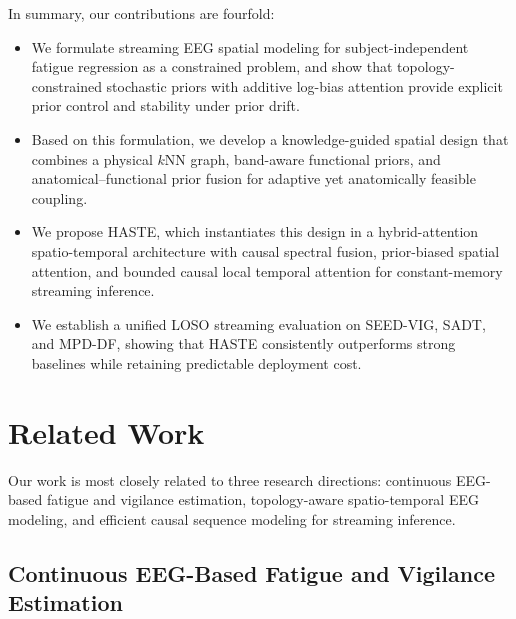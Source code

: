 \documentclass[preprint,12pt]{elsarticle}
\begin{document}
In summary, our contributions are fourfold:
\begin{itemize}
\item We formulate streaming EEG spatial modeling for subject-independent fatigue regression as a constrained problem, and show that topology-constrained stochastic priors with additive log-bias attention provide explicit prior control and stability under prior drift.

\item Based on this formulation, we develop a knowledge-guided spatial design that combines a physical $k$NN graph, band-aware functional priors, and anatomical--functional prior fusion for adaptive yet anatomically feasible coupling.

\item We propose HASTE, which instantiates this design in a hybrid-attention spatio-temporal architecture with causal spectral fusion, prior-biased spatial attention, and bounded causal local temporal attention for constant-memory streaming inference.

\item We establish a unified LOSO streaming evaluation on SEED-VIG, SADT, and MPD-DF, showing that HASTE consistently outperforms strong baselines while retaining predictable deployment cost.
\end{itemize}

\section{Related Work}
\label{sec:related_work}

Our work is most closely related to three research directions: continuous EEG-based fatigue and vigilance estimation, topology-aware spatio-temporal EEG modeling, and efficient causal sequence modeling for streaming inference.

\subsection{Continuous EEG-Based Fatigue and Vigilance Estimation}
\end{document}
